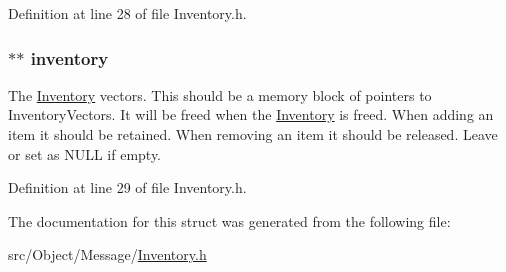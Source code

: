 Definition at line 28 of file Inventory.h.

\hypertarget{struct_inventory_a5434993362e4e5b940a640f34b3c417d}{
\subsubsection[{inventory}]{$\ast$$\ast$ {\bf inventory}}}
\label{struct_inventory_a5434993362e4e5b940a640f34b3c417d}
The \hyperlink{struct_inventory}{Inventory} vectors. This should be a memory block of pointers to InventoryVectors. It will be freed when the \hyperlink{struct_inventory}{Inventory} is freed. When adding an item it should be retained. When removing an item it should be released. Leave or set as NULL if empty. 

Definition at line 29 of file Inventory.h.



The documentation for this struct was generated from the following file:\begin{DoxyCompactItemize}
\item 
src/Object/Message/\hyperlink{_inventory_8h}{Inventory.h}\end{DoxyCompactItemize}
